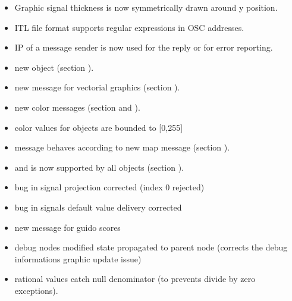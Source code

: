 \begin{itemize}
\item Graphic signal thickness is now symmetrically drawn around y position.
\item ITL file format supports regular expressions in OSC addresses.
\item IP of a message sender is now used for the reply or for error reporting.
\item new  object (section ).
\item new  message for vectorial graphics (section ).
\item new color messages  (section  and  ).
\item color values for objects are bounded to [0,255]
\item {} message behaves according to new map message (section ).
\item {} and   is now supported by all objects (section ).
\item  bug in signal projection corrected (index 0 rejected)
\item  bug in signals default value delivery corrected
\item  new  message for guido scores
\item  debug nodes modified state propagated to parent node (corrects the debug informations graphic update issue)
\item rational values catch null denominator (to prevents divide by zero exceptions).
\end{itemize}


